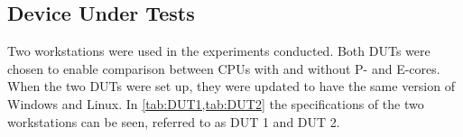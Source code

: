 
\subsection{Device Under Tests}
Two workstations were used in the experiments conducted. Both DUTs were chosen to enable comparison between CPUs with and without P- and E-cores. When the two DUTs were set up, they were updated to have the same version of Windows and Linux. In \cref {tab:DUT1,tab:DUT2} the specifications of the two workstations can be seen, referred to as DUT 1 and DUT 2. 





